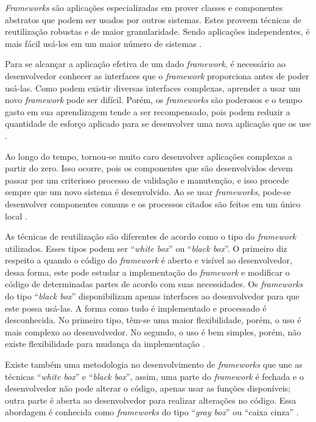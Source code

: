 \textit{Frameworks} são aplicações especializadas em prover classes e componentes abstratos que podem ser usados por outros sistemas. Estes proveem técnicas de reutilização robustas e de maior granularidade. Sendo aplicações independentes, é mais fácil usá-los em um maior número de sistemas \cite{Johnson:Foote:1988}.

Para se alcançar a aplicação efetiva de um dado \textit{framework}, é necessário ao desenvolvedor conhecer as interfaces que o \textit{framework} proporciona antes de poder usá-las. Como podem existir diversas interfaces complexas, aprender a usar um novo \textit{framework} pode ser difícil. Porém, os \textit{frameworks} são poderosos e o tempo gasto em sua aprendizagem tende a ser recompensado, pois podem reduzir a quantidade de esforço aplicado para se desenvolver uma nova aplicação que os use \cite{Johnson:1997}.

Ao longo do tempo, tornou-se muito caro desenvolver aplicações complexas a partir do zero. Isso ocorre, pois os componentes que são desenvolvidos devem passar por um criterioso processo de validação e manutenção, e isso procede sempre que um novo sistema é desenvolvido. Ao se usar \textit{frameworks}, pode-se desenvolver componentes comuns e os processos citados são feitos em um único local \cite{Fayad:Schimidt:1997}.

As técnicas de reutilização são diferentes de acordo como o tipo do \textit{framework} utilizados. Esses tipos podem ser ``\textit{white box}'' ou ``\textit{black box}''. O primeiro diz respeito a quando o código do \textit{framework} é aberto e visível ao desenvolvedor, dessa forma, este pode estudar a implementação do \textit{framework} e modificar o código de determinadas partes de acordo com suas necessidades. Os \textit{frameworks} do tipo ``\textit{black box}'' disponibilizam apenas interfaces ao desenvolvedor para que este possa usá-las. A forma como tudo é implementado e processado é desconhecida. No primeiro tipo, têm-se uma maior flexibilidade, porém, o uso é mais complexo ao desenvolvedor. No segundo, o uso é bem simples, porém, não existe flexibilidade para mudança da implementação \cite{Kroth:2000}.

Existe também uma metodologia no desenvolvimento de \textit{frameworks} que une as técnicas ``\textit{white box}'' e ``\textit{black box}'', assim, uma parte do \textit{framework} é fechada e o desenvolvedor não pode alterar o código, apenas usar as funções disponíveis; outra parte é aberta ao desenvolvedor para realizar alterações no código. Essa abordagem é conhecida como \textit{frameworks} do tipo ``\textit{gray box}'' ou ``caixa cinza'' \cite{Kristensen:2004}.

